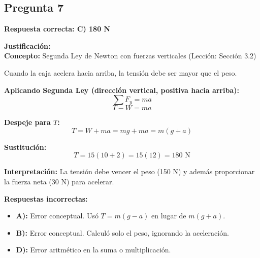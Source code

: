 \newpage
\begin{respuestabox}
\subsection{Pregunta 7}
\textcolor{verdecorrecto}{\textbf{Respuesta correcta: C) 180 N}}

\textbf{Justificación:}\\
\textbf{Concepto:} Segunda Ley de Newton con fuerzas verticales (Lección: Sección 3.2)

Cuando la caja acelera hacia arriba, la tensión debe ser mayor que el peso.

\textbf{Aplicando Segunda Ley (dirección vertical, positiva hacia arriba):}
$$\sum F_y = ma$$
$$T - W = ma$$

\textbf{Despeje para $T$:}
$$T = W + ma = mg + ma = m(g + a)$$

\textbf{Sustitución:}
$$T = 15(10 + 2) = 15(12) = 180 \text{ N}$$

\textbf{Interpretación:} La tensión debe vencer el peso (150 N) y además proporcionar la fuerza neta (30 N) para acelerar.

\textbf{Respuestas incorrectas:}
\begin{itemize}
    \item \textbf{A):} Error conceptual. Usó $T = m(g - a)$ en lugar de $m(g + a)$.
    \item \textbf{B):} Error conceptual. Calculó solo el peso, ignorando la aceleración.
    \item \textbf{D):} Error aritmético en la suma o multiplicación.
\end{itemize}
\end{respuestabox}

